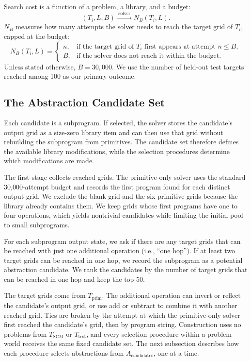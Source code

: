 \documentclass[10pt]{article}
\begin{document}
Search cost is a function of a problem, a library, and a budget:
\[
  (T_i, L, B) \xrightarrow{\;\text{solver}\;} N_B(T_i, L).
\]
$N_B$ measures how many attempts the solver needs to reach the target grid of
$T_i$, capped at the budget:
\begin{equation}
  N_B(T_i,L)=
  \begin{cases}
    n, & \text{if the target grid of $T_i$ first appears at attempt $n\leq B$},\\
    B, & \text{if the solver does not reach it within the budget}.
  \end{cases}
\end{equation}
Unless stated otherwise, $B=30{,}000$. We use the number of held-out test
targets reached among 100 as our primary outcome.

\subsection{The Abstraction Candidate Set}
\label{sec:abstraction-candidates}

Each candidate is a subprogram. If selected, the solver stores the
candidate's output grid as a size-zero library item and can then use that
grid without rebuilding the subprogram from primitives. The candidate set
therefore defines the available library modifications, while the selection
procedures determine which modifications are made.

The first stage collects reached grids. The primitive-only solver uses the
standard 30,000-attempt budget and records the first program found for each
distinct output grid. We exclude the blank grid and the six primitive grids
because the library already contains them. We keep grids whose first programs
have one to four operations, which yields nontrivial candidates while
limiting the initial pool to small subprograms.

For each subprogram output state, we ask if there are any target grids
that can be reached with just one additional operation (i.e., ``one hop'').
If at least two target grids can be reached in one hop, we record the
subprogram as a potential abstraction candidate. We rank the candidates
by the number of target grids that can be reached in one hop and keep
the top 50.

The target grids come from $T_{\mathrm{prim}}$. The additional operation
can invert or reflect the candidate's output grid, or use add or subtract
to combine it with another reached grid. Ties are broken by the attempt
at which the primitive-only solver first reached the candidate's grid,
then by program string. Construction uses no problems from
$T_{\mathrm{SCM}}$ or $T_{\mathrm{test}}$, and every
selection procedure within a problem world receives the same fixed candidate
set. The next subsection describes how each procedure selects abstractions
from $A_{\mathrm{candidates}}$, one at a time.
\end{document}
